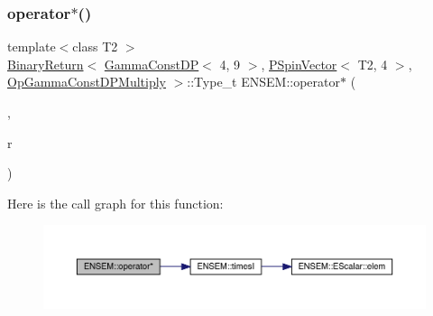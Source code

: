\mbox{\label{group__primspinvector_ga39c7d40232a2f254a4b3903a51cb61db}} 
\subsubsection{\texorpdfstring{operator$\ast$()}{operator*()}\hspace{0.1cm}{\footnotesize\ttfamily [26/32]}}
{\footnotesize\ttfamily template$<$class T2 $>$ \\
\mbox{\hyperlink{structENSEM_1_1BinaryReturn}{Binary\+Return}}$<$ \mbox{\hyperlink{classENSEM_1_1GammaConstDP}{Gamma\+Const\+DP}}$<$ 4, 9 $>$, \mbox{\hyperlink{classENSEM_1_1PSpinVector}{P\+Spin\+Vector}}$<$ T2, 4 $>$, \mbox{\hyperlink{structENSEM_1_1OpGammaConstDPMultiply}{Op\+Gamma\+Const\+D\+P\+Multiply}} $>$\+::Type\+\_\+t E\+N\+S\+E\+M\+::operator$\ast$ (\begin{DoxyParamCaption}\item[{const \mbox{\hyperlink{classENSEM_1_1GammaConstDP}{Gamma\+Const\+DP}}$<$ 4, 9 $>$ \&}]{,  }\item[{const \mbox{\hyperlink{classENSEM_1_1PSpinVector}{P\+Spin\+Vector}}$<$ T2, 4 $>$ \&}]{r }\end{DoxyParamCaption})\hspace{0.3cm}{\ttfamily [inline]}}

Here is the call graph for this function\+:\nopagebreak
\begin{figure}[H]
\begin{center}
\leavevmode
\includegraphics[width=350pt]{dd/d6d/group__primspinvector_ga39c7d40232a2f254a4b3903a51cb61db_cgraph}
\end{center}
\end{figure}
\mbox{\label{group__primspinvector_gaba02d1dbf98d31e3ed096064681c46aa}} 
